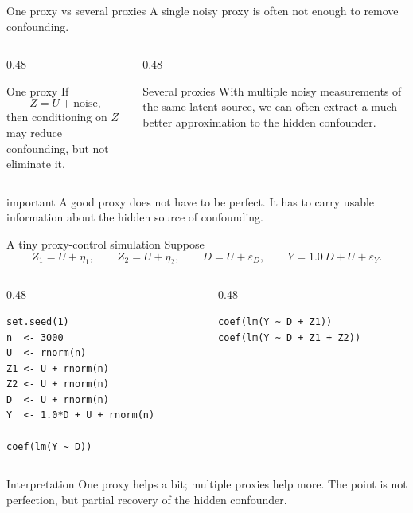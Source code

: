\documentclass[dvipsnames,aspectratio=169,handout]{beamer}
\begin{document}
\begin{frame}{One proxy vs several proxies}
A single noisy proxy is often not enough to remove confounding.

\begin{columns}[T]
\begin{column}{0.48\textwidth}
\begin{block}{One proxy}
If
\[
Z = U + \text{noise},
\]
then conditioning on $Z$ may reduce confounding, but not eliminate it.
\end{block}
\end{column}
\begin{column}{0.48\textwidth}
\begin{block}{Several proxies}
With multiple noisy measurements of the same latent source, we can often extract a much better approximation to the hidden confounder.
\end{block}
\end{column}
\end{columns}

\begin{beamercolorbox}[wd=\textwidth,sep=7pt,center,rounded=true,shadow=true]{important}
A good proxy does not have to be perfect. It has to carry usable information about the hidden source of confounding.
\end{beamercolorbox}
\end{frame}

\begin{frame}[fragile]{A tiny proxy-control simulation}
Suppose
\[
Z_1 = U + \eta_1,\qquad
Z_2 = U + \eta_2,\qquad
D = U + \varepsilon_D,\qquad
Y = 1.0\,D + U + \varepsilon_Y.
\]

\begin{columns}[T,onlytextwidth]
\begin{column}{0.48\textwidth}
\begin{lstlisting}
set.seed(1)
n  <- 3000
U  <- rnorm(n)
Z1 <- U + rnorm(n)
Z2 <- U + rnorm(n)
D  <- U + rnorm(n)
Y  <- 1.0*D + U + rnorm(n)

coef(lm(Y ~ D))
\end{lstlisting}
\end{column}
\begin{column}{0.48\textwidth}
\begin{lstlisting}
coef(lm(Y ~ D + Z1))
coef(lm(Y ~ D + Z1 + Z2))
\end{lstlisting}
\end{column}
\end{columns}

\begin{alertblock}{Interpretation}
One proxy helps a bit; multiple proxies help more.
The point is not perfection, but partial recovery of the hidden confounder.
\end{alertblock}
\end{frame}
\end{document}

